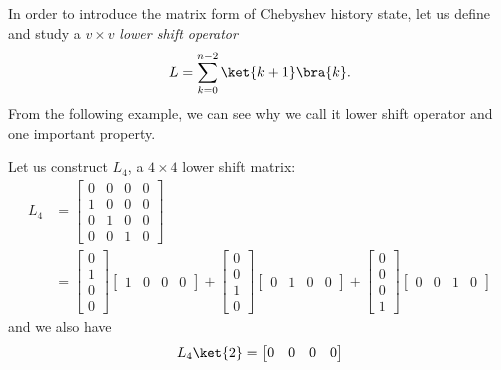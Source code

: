 In order to introduce the matrix form of Chebyshev history state, let us define and study a $v\times v$ \textit{lower shift operator}
\begin{equation}
    L=\sum_{k=0}^{n-2}\ket{k+1}\bra{k}.
    \label{eqn:LowerShift}
\end{equation}
From the following example, we can see why we call it lower shift operator and one important property.
\begin{example}
    Let us construct $L_4$, a $4\times4$ lower shift matrix:
    \begin{equation}
        \begin{split}
            L_4&=\begin{bmatrix}
            0&0&0&0\\
            1&0&0&0\\
            0&1&0&0\\
            0&0&1&0
        \end{bmatrix} \\
        &=\begin{bmatrix}
            0\\1\\0\\0
        \end{bmatrix}
        \begin{bmatrix}
            1&0&0&0
        \end{bmatrix}+
        \begin{bmatrix}
            0\\0\\1\\0
        \end{bmatrix}
        \begin{bmatrix}
            0&1&0&0
        \end{bmatrix} +
        \begin{bmatrix}
            0\\0\\0\\1
        \end{bmatrix}
        \begin{bmatrix}
            0&0&1&0
        \end{bmatrix}
        \end{split}       
    \end{equation}
    and we also have
    \begin{equation}
        L_4\ket{2}=\begin{bmatrix}
            0&0&0&0\\

\end{bmatrix}
\end{equation}
\end{example}
